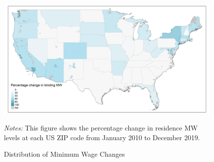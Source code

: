 \begin{figure}[h!]
	\centering
	\caption{Distribution of Minimum Wage Changes}
	\label{fig:mw_perc_changes_long_run}
	\includegraphics[width = \textwidth]
	    {../../analysis/maps_mw_long_run/output/USchange_perc_actual_mw.png}
	\begin{minipage}{.95\textwidth} \footnotesize
		\vspace{3mm}
		\textit{Notes:} This figure shows the percentage change in residence MW levels
		at each US ZIP code from January 2010 to December 2019.
	\end{minipage}
\end{figure}